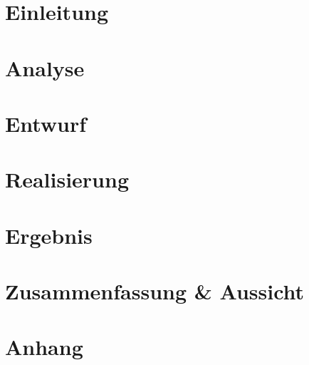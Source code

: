 \documentclass[a4paper, 12pt, parskip=half]{scrbook}
\title{\thesisTitle}
\author{\thesisAuthor}
\date{\today{}}
\begin{document}
	\frontmatter
	
	
	\cleardoublepage
	\pagestyle{scrheadings}
	
	\tableofcontents	

	
	\mainmatter
	
	\rofoot{\textbf{\headmark~~$\mid$~~\pagemark}}
	
	\chapter{Einleitung}
	
	
	\chapter{Analyse}
	
	\chapter{Entwurf}
	
	\chapter{Realisierung}
	
	\chapter{Ergebnis}
	
	\chapter{Zusammenfassung \& Aussicht}
	
	\backmatter 
	\rofoot{\textbf{$\mid$~~\pagemark}}
	\lefoot{\textbf{\pagemark~~$\mid$}}
	\chapter{Anhang}
	
	\listoffigures
	
	\listoftables
	
	\printbibliography
	 
	\printindex
	
\end{document}
